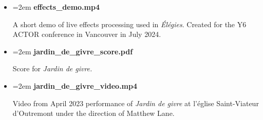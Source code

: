 \documentclass[12pt,twoside,maitrise]{dms_ks}
\theoremstyle{definition}
\begin{document}
{\begin{itemize}
    \item \hangindent=2em \textbf{effects\_demo.mp4}
    \par A short demo of live effects processing used in \textit{Élégies}. Created for the Y6 ACTOR conference in Vancouver in July 2024.

    \item \hangindent=2em \textbf{jardin\_de\_givre\_score.pdf}
    \par Score for \textit{Jardin de givre.}
    
    \item \hangindent=2em \textbf{jardin\_de\_givre\_video.mp4}
	    \par Video from April 2023 performance of \textit{Jardin de givre} at l'église Saint-Viateur d'Outremont under the direction of Matthew Lane.
\end{itemize}



}
\end{document}
